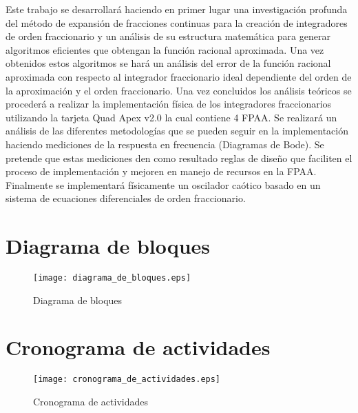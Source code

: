 	Este trabajo se desarrollará haciendo en primer lugar una investigación profunda del método de expansión de fracciones continuas para la creación de integradores de orden fraccionario y un análisis de su estructura matemática para generar algoritmos eficientes que obtengan la función racional aproximada. Una vez obtenidos estos algoritmos se hará un análisis del error de la función racional aproximada con respecto al integrador fraccionario ideal dependiente del orden de la aproximación y el orden fraccionario. Una vez concluidos los análisis teóricos se procederá a realizar la implementación física de los integradores fraccionarios utilizando la tarjeta Quad Apex v2.0 la cual contiene 4 FPAA. Se realizará un análisis de las diferentes metodologías que se pueden seguir en la implementación haciendo mediciones de la respuesta en frecuencia (Diagramas de Bode). Se pretende que estas mediciones den como resultado reglas de diseño que faciliten el proceso de implementación y mejoren en manejo de recursos en la FPAA. Finalmente se implementará físicamente un oscilador caótico basado en un sistema de ecuaciones diferenciales de orden fraccionario.
	
	\newpage
	\section{Diagrama de bloques}	
	\begin{figure}[hbtp]
	\centering
	\texttt{[image: diagrama\_de\_bloques.eps]}
	\caption{Diagrama de bloques}
	\end{figure}
	
	\section{Cronograma de actividades}
	\begin{figure}[hbtp]
	\centering
	\texttt{[image: cronograma\_de\_actividades.eps]}
	\caption{Cronograma de actividades}
	\end{figure}		
		
%		
	
	
	
	